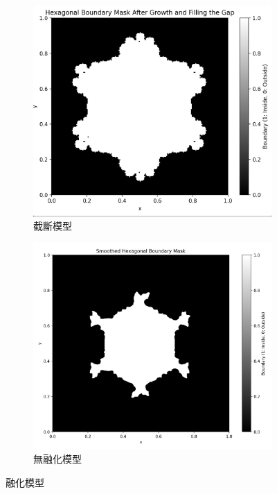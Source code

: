 \documentclass[12pt, a4paper]{article}
\theoremstyle{mystyle}	%
\begin{document}
\begin{figure}[H]
\centering
\begin{subfigure}{.5\textwidth}
    \centering
    \includegraphics[height=.8\linewidth]{sphere.png}
    \caption{截斷模型}
    \label{pot}
\end{subfigure}%
\begin{subfigure}{.5\textwidth}
    \centering
    \includegraphics[height=.8\linewidth]{no_melt.png}
    \caption{無融化模型}
    \label{grad}
    \end{subfigure}
    \caption{融化模型}
    \label{pog}
\end{figure}
\end{document}
